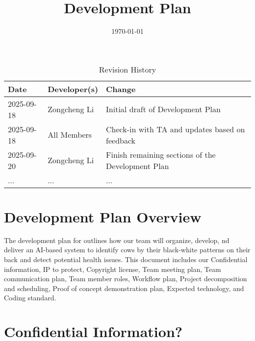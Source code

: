 \documentclass{article}
\title{Development Plan\\\progname}
\author{\authname}
\date{\today}
\begin{document}
\maketitle

\begin{table}[hp]
\caption{Revision History} \label{TblRevisionHistory}
\begin{tabularx}{\textwidth}{llX}
\toprule
\textbf{Date} & \textbf{Developer(s)} & \textbf{Change}\\
\midrule
2025-09-18 & Zongcheng Li & Initial draft of Development Plan \\
2025-09-18 & All Members& Check-in with TA and updates based on feedback \\
2025-09-20 & Zongcheng Li & Finish remaining sections of the Development Plan \\
... & ... & ...\\
\bottomrule
\end{tabularx}
\end{table}

\newpage{}


\section{Development Plan Overview}
The development plan for \progname{} outlines how our team will organize, develop, 
nd deliver an AI-based system to identify cows by their black-white patterns on their back 
and detect potential health issues. This document includes our Confidential information, 
IP to protect, Copyright license, Team meeting plan, Team communication plan, Team member 
roles, Workflow plan, Project decomposition and scheduling, Proof of concept demonstration 
plan, Expected technology, and Coding standard.


\section{Confidential Information?}

\end{document}
